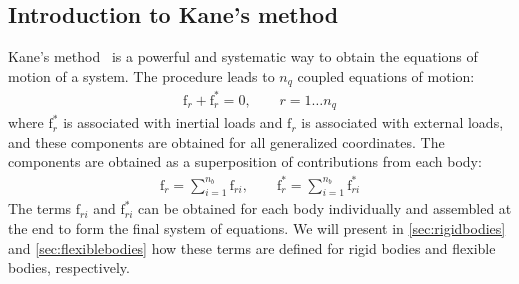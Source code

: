 \documentclass[wes, manuscript]{copernicus}
\renewcommand{\v}[1]{\boldsymbol{#1}}
\newcommand{\kanef}{\mathrm{f}}
\begin{document}
\subsection{Introduction to Kane's method}

Kane's method~\citep{kane:1965} is a powerful and systematic way to obtain the equations of motion of a system.
    The procedure leads to $n_q$ coupled equations of motion:
\begin{align}
   \kanef_r + \kanef_r^* =0 ,\qquad r=1\dots n_q
      \label{eq:EOMfrfrstar} 
\end{align}
where $\kanef_r^*$ is associated with inertial loads and $\kanef_r$ is associated with external loads, and these components are obtained for all generalized coordinates. 
The components are obtained as a superposition of contributions from each body:
\begin{align}
   \kanef_{r}   = \sum\limits_{i=1}^{n_b} \kanef_{ri}
   ,\qquad
   \kanef_{r}^* = \sum\limits_{i=1}^{n_b} \kanef_{ri}^*
   \label{eq:frfrstarMultiBody}
\end{align}
The terms $\kanef_{ri}$ and $\kanef_{ri}^*$ can be obtained for each body individually and assembled at the end to form the final system of equations.
We will present in \autoref{sec:rigidbodies} and \autoref{sec:flexiblebodies} how these terms are defined for rigid bodies and flexible bodies, respectively. 

\end{document}
